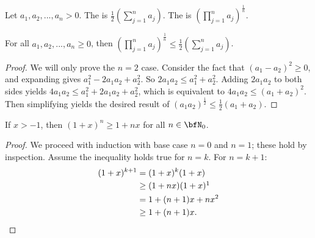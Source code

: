     \begin{definition}
        Let $a_1,a_2,...,a_n > 0$. The  is $\frac{1}{2} \left(\sum_{j=1}^n a_j\right)$. The  is $\left(\prod_{j = 1}^n a_j\right)^{\frac{1}{n}}$.
    \end{definition}

    \begin{proposition}[AM-GM Inequality]\label{prop:am-gm}
        For all $a_1, a_2, ... ,a_n \geq 0$, then $\left(\prod_{j = 1}^n a_j\right)^{\frac{1}{n}} \leq \frac{1}{2} \left(\sum_{j=1}^n a_j\right)$.
    \end{proposition}
        \begin{proof}
            We will only prove the $n = 2$ case. Consider the fact that $(a_1  - a_2)^2 \geq 0$, and expanding gives $a_1^2 - 2a_1a_2 + a_2 ^2$. So $2a_1 a_2 \leq a_1^2 + a_2^2$. Adding $2a_1a_2$ to both sides yields $4a_1a_2 \leq a_1^2 + 2a_1a_2 + a_2^2$, which is equivalent to $4a_1a_2 \leq (a_1 + a_2)^2$. Then simplifying yields the desired result of $(a_1 a_2)^{\frac{1}{2}} \leq \frac{1}{2}(a_1 + a_2)$.
        \end{proof}
    
    \begin{proposition}\label{prop:bernoulli}
        If $x > -1$, then $(1+x)^n \geq 1+nx$ for all $n \in \bfN_0$.
    \end{proposition}
        \begin{proof}
            We proceed with induction with base case $n=0$ and $n=1$; these hold by inspection. Assume the inequality holds true for $n = k$. For $n=k+1$:
                \begin{equation*}
                \begin{split}
                    (1+x)^{k+1}
                    & = (1+x)^k(1+x) \\
                    & \geq (1+nx)(1+x)\footnotemark \\
                    & = 1 + (n+1)x + nx^2 \\
                    & \geq 1 +(n+1)x.
                \end{split}
                \end{equation*}
        \end{proof}

